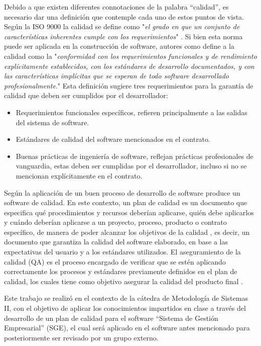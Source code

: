 \documentclass[a4paper,10pt]{article}
\begin{document}
	Debido a que existen diferentes connotaciones de la palabra “calidad”, es necesario dar una
	definición que contemple cada uno de estos puntos de vista. Según la ISO 9000 la calidad se
	define como "\textit{el grado en que un conjunto de características inherentes cumple con los requerimientos}" \parencite{ISO_9001_2015}. Si bien esta norma puede ser
	aplicada en la construcción de software, autores como \parencite{Pressman_2010} define a la calidad como
	la "\textit{conformidad con los requerimientos funcionales y de rendimiento explícitamente establecidos, con
		los estándares de desarrollo documentados, y con las características implícitas que se esperan de
		todo software desarrollado profesionalmente}." Esta definición sugiere tres requerimientos para la
		garantía de calidad que deben ser cumplidos por el desarrollador:
		\begin{itemize}
			\item Requerimientos funcionales específicos, refieren principalmente a las salidas del sistema de software.
			\item Estándares de calidad del software mencionados en el contrato.
			\item Buenas prácticas de ingeniería de software, reflejan prácticas profesionales de
			vanguardia, estas deben ser cumplidas por el desarrollador, incluso si no se mencionan
			explícitamente en el contrato.
		\end{itemize}
		Según \parencite{Deming_2018} la aplicación de un buen proceso de desarrollo de software
		produce un software de calidad. En este contexto, un plan de calidad es un documento que
		especifica qué procedimientos y recursos deberían aplicarse, quién debe aplicarlos y cuándo
		deberían aplicarse a un proyecto, proceso, producto o contrato específico, de manera de poder
		alcanzar los objetivos de la calidad \parencite{Álvarez_López_2005}, es decir, un documento que
		garantiza la calidad del software elaborado, en base a las expectativas del usuario y a los
		estándares utilizados. El aseguramiento de la calidad (QA) es el proceso encargado de verificar que se estén aplicando
		correctamente los procesos y estándares previamente definidos en el plan de calidad, los cuales
		tiene como objetivo asegurar la calidad del producto final \parencite{Sommerville_2011}.
		
		Este trabajo se realizó en el contexto de la cátedra de Metodología de Sistemas II, con el objetivo
		de aplicar los conocimientos impartidos en clase a través del desarrollo de un plan de calidad
		para el software “Sistema de Gestión Empresarial” (SGE), el cual será aplicado en el software
		antes mencionado para posteriormente ser revisado por un grupo externo.
\end{document}
